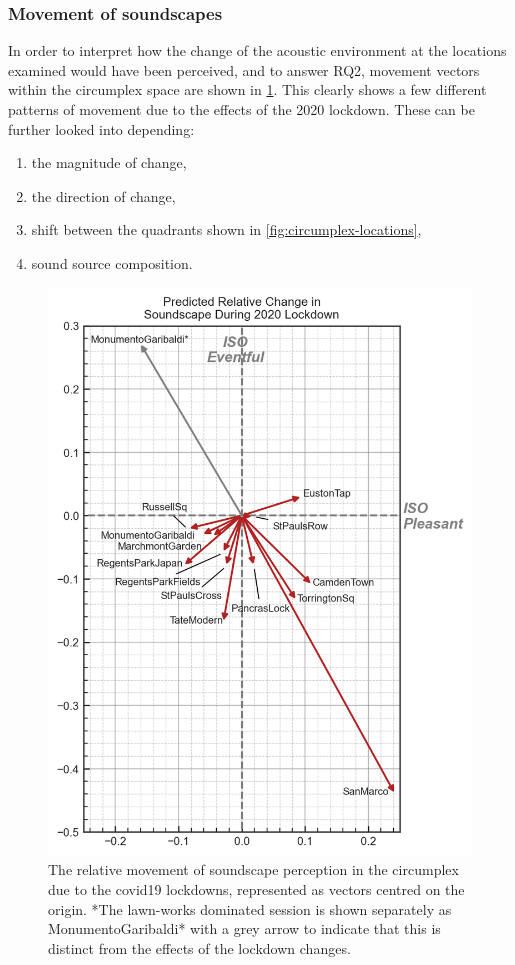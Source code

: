    \subsubsection{Movement of soundscapes}

   In order to interpret how the change of the acoustic environment at the locations examined would have been perceived, and to answer RQ2, movement vectors within the circumplex space are shown in \cref{fig:circumplex-vectors}. This clearly shows a few different patterns of movement due to the effects of the 2020 lockdown. These can be further looked into depending:

   \begin{enumerate}
     \item the magnitude of change,
     \item the direction of change,
     \item shift between the quadrants shown in \cref{fig:circumplex-locations},
     \item sound source composition.
   \end{enumerate}

   \begin{figure}[h!]
     \caption{The relative movement of soundscape perception in the circumplex due to the \gls{covid19} lockdowns, represented as vectors centred on the origin. *The lawn-works dominated session is shown separately as MonumentoGaribaldi* with a grey arrow to indicate that this is distinct from the effects of the lockdown changes. \label{fig:circumplex-vectors}}
    \centering
    \includegraphics[width=.75\textwidth]{Figures/Lockdown Figure6.jpg}
   \end{figure}

